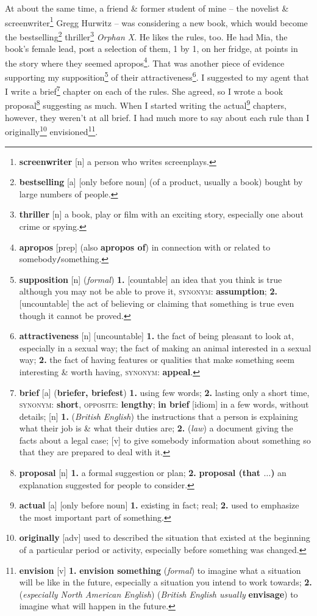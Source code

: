 \documentclass[oneside]{book}
\numberwithin{equation}{section}
\begin{document}
At about the same time, a friend \& former student of mine -- the novelist \& screenwriter\footnote{\textbf{screenwriter} [n] a person who writes screenplays.} Gregg Hurwitz -- was considering a new book, which would become the bestselling\footnote{\textbf{bestselling} [a] [only before noun] (of a product, usually a book) bought by large numbers of people.} thriller\footnote{\textbf{thriller} [n] a book, play or film with an exciting story, especially one about crime or spying.} \textit{Orphan X}. He likes the rules, too. He had Mia, the book's female lead, post a selection of them, 1 by 1, on her fridge, at points in the story where they seemed apropos\footnote{\textbf{apropos} [prep] (also \textbf{apropos of}) in connection with or related to somebody\texttt{/}something.}. That was another piece of evidence supporting my supposition\footnote{\textbf{supposition} [n] (\textit{formal}) \textbf{1.} [countable] an idea that you think is true although you may not be able to prove it, \textsc{synonym}: \textbf{assumption}; \textbf{2.} [uncountable] the act of believing or claiming that something is true even though it cannot be proved.} of their attractiveness\footnote{\textbf{attractiveness} [n] [uncountable] \textbf{1.} the fact of being pleasant to look at, especially in a sexual way; the fact of making an animal interested in a sexual way; \textbf{2.} the fact of having features or qualities that make something seem interesting \& worth having, \textsc{synonym}: \textbf{appeal}.}. I suggested to my agent that I write a brief\footnote{\textbf{brief} [a] (\textbf{briefer, briefest}) \textbf{1.} using few words; \textbf{2.} lasting only a short time, \textsc{synonym}: \textbf{short}, \textsc{opposite}: \textbf{lengthy}; \textbf{in brief} [idiom] in a few words, without details; [n] \textbf{1.} (\textit{British English}) the instructions that a person is explaining what their job is \& what their duties are; \textbf{2.} (\textit{law}) a document giving the facts about a legal case; [v] to give somebody information about something so that they are prepared to deal with it.} chapter on each of the rules. She agreed, so I wrote a book proposal\footnote{\textbf{proposal} [n] \textbf{1.} a formal suggestion or plan; \textbf{2.} \textbf{proposal (that $\ldots$)} an explanation suggested for people to consider.} suggesting as much. When I started writing the actual\footnote{\textbf{actual} [a] [only before noun] \textbf{1.} existing in fact; real; \textbf{2.} used to emphasize the most important part of something.} chapters, however, they weren't at all brief. I had much more to say about each rule than I originally\footnote{\textbf{originally} [adv] used to described the situation that existed at the beginning of a particular period or activity, especially before something was changed.} envisioned\footnote{\textbf{envision} [v] \textbf{1.} \textbf{envision something} (\textit{formal}) to imagine what a situation will be like in the future, especially a situation you intend to work towards; \textbf{2.} (\textit{especially North American English}) (\textit{British English usually} \textbf{envisage}) to imagine what will happen in the future.}.
\end{document}
